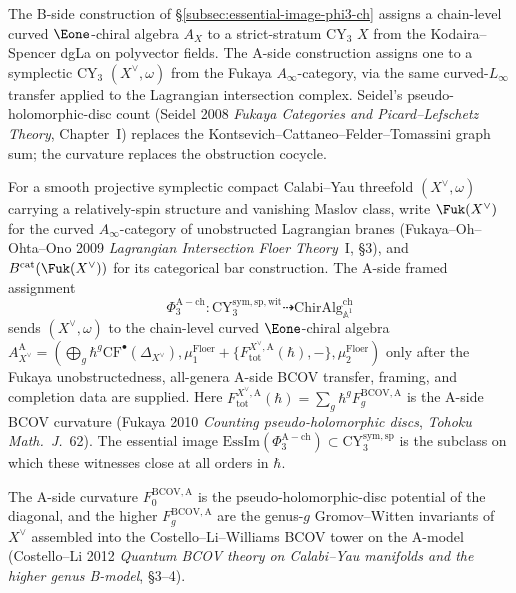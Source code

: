 The B-side construction of \S\ref{subsec:essential-image-phi3-ch} assigns a chain-level curved $\Eone$-chiral algebra $A_X$ to a strict-stratum CY$_3$ $X$ from the Kodaira--Spencer dgLa on polyvector fields. The A-side construction assigns one to a symplectic CY$_3$ $(X^\vee, \omega)$ from the Fukaya $A_\infty$-category, via the same curved-$L_\infty$ transfer applied to the Lagrangian intersection complex. Seidel's pseudo-holomorphic-disc count (Seidel 2008 \textit{Fukaya Categories and Picard--Lefschetz Theory}, Chapter~I) replaces the Kontsevich--Cattaneo--Felder--Tomassini graph sum; the curvature replaces the obstruction cocycle.

\begin{definition}
\label{def:phi3-Ach-essential-image}
For a smooth projective symplectic compact Calabi--Yau threefold $(X^\vee, \omega)$ carrying a relatively-spin structure and vanishing Maslov class, write $\Fuk(X^\vee)$ for the curved $A_\infty$-category of unobstructed Lagrangian branes (Fukaya--Oh--Ohta--Ono 2009 \textit{Lagrangian Intersection Floer Theory}~I, \S3), and $B^{\mathrm{cat}}(\Fuk(X^\vee))$ for its categorical bar construction. The A-side framed assignment
\[
 \Phi_3^{\mathrm{A-ch}} \colon \mathrm{CY}_3^{\mathrm{sym,sp,wit}} \dashrightarrow \mathrm{ChirAlg}^{\mathrm{ch}}_{\mathbb{A}^1}
\]
sends $(X^\vee, \omega)$ to the chain-level curved $\Eone$-chiral algebra $A_{X^\vee}^{\mathrm{A}} = (\bigoplus_g \hbar^g \mathrm{CF}^{\bullet}(\Delta_{X^\vee}), \mu_1^{\mathrm{Floer}} + \{F_{\mathrm{tot}}^{X^\vee,\mathrm{A}}(\hbar), -\}, \mu_2^{\mathrm{Floer}})$ only after the Fukaya unobstructedness, all-genera A-side BCOV transfer, framing, and completion data are supplied. Here $F_{\mathrm{tot}}^{X^\vee,\mathrm{A}}(\hbar) = \sum_g \hbar^g F_g^{\mathrm{BCOV,A}}$ is the A-side BCOV curvature (Fukaya 2010 \textit{Counting pseudo-holomorphic discs}, \textit{Tohoku Math.~J.}~62). The essential image $\mathrm{EssIm}(\Phi_3^{\mathrm{A-ch}}) \subset \mathrm{CY}_3^{\mathrm{sym,sp}}$ is the subclass on which these witnesses close at all orders in $\hbar$.
\end{definition}

The A-side curvature $F_0^{\mathrm{BCOV,A}}$ is the pseudo-holomorphic-disc potential of the diagonal, and the higher $F_g^{\mathrm{BCOV,A}}$ are the genus-$g$ Gromov--Witten invariants of $X^\vee$ assembled into the Costello--Li--Williams BCOV tower on the A-model (Costello--Li 2012 \textit{Quantum BCOV theory on Calabi--Yau manifolds and the higher genus B-model}, \S3--4).

